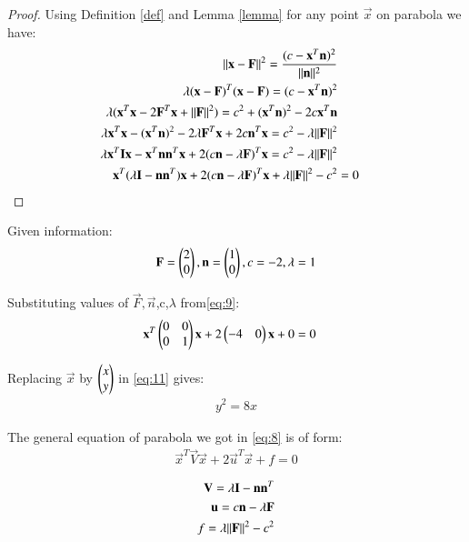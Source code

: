 \documentclass[journal,12pt,twocolumn]{IEEEtran}
\begin{document}
\begin{proof}

Using Definition \ref{def} and Lemma \ref{lemma} for any point $\vec{x}$ on parabola we have:
\begin{align}
\Vert\mathbf{x}-\mathbf{F}\rVert^2=\frac{({c-\mathbf{x}^T\mathbf{n}})^2}{\Vert\mathbf{n}\rVert^2}\label{eq:1} \\
\lambda(\mathbf{x}-\mathbf{F})^T(\mathbf{x}-\mathbf{F})=(c-\mathbf{x}^T\mathbf{n})^2
\\
\lambda(\mathbf{x}^T\mathbf{x}-2\mathbf{F}^T\mathbf{x}+\Vert\mathbf{F}\rVert^2)=c^2+(\mathbf{x}^T\mathbf{n})^2-2c\mathbf{x}^T\mathbf{n}\\
\lambda\mathbf{x}^T\mathbf{x}-(\mathbf{x}^T\mathbf{n})^2-2\lambda\mathbf{F}^T\mathbf{x}+2c\mathbf{n}^T\mathbf{x}=c^2-\lambda\Vert\mathbf{F}\rVert^2\\
\lambda\mathbf{x}^T\mathbf{I}\mathbf{x}-\mathbf{x}^T\mathbf{n}\mathbf{n}^T\mathbf{x}+2(c\mathbf{n}-\lambda\mathbf{F})^T\mathbf{x}=c^2-\lambda\Vert\mathbf{F}\rVert^2\\
\mathbf{x}^T(\lambda\mathbf{I}-\mathbf{n}\mathbf{n}^T)\mathbf{x}+2(c\mathbf{n}-\lambda\mathbf{F})^T\mathbf{x}+\lambda\Vert\mathbf{F}\rVert^2-c^2&=0\label{eq:8}
\end{align}
\end{proof}
Given information:
\begin{align}
\mathbf{F}=\begin{pmatrix}2\\0\end{pmatrix},
\mathbf{n}=\begin{pmatrix}1\\0\end{pmatrix},
c=-2\label{eq:9},
\lambda=1
\end{align}


Substituting values of $\vec{F},\vec{n}$,c,$\lambda$ from\eqref{eq:9}:
\begin{align}
\mathbf{x}^T\begin{pmatrix}0&0\\0&1\end{pmatrix}\mathbf{x}+2\begin{pmatrix}-4&0\end{pmatrix}\mathbf{x}+0&=0\label{eq:11}
\end{align}

Replacing $\vec{x}$ by $\begin{pmatrix}x\\y\end{pmatrix}$ in \eqref{eq:11} gives:
\begin{align}
y^2=8x
\end{align}

The general equation of parabola we got in \eqref{eq:8} is of form:
\begin{align}
\vec{x}^T\vec{V}\vec{x}+2\vec{u}^T\vec{x}+f=0
\end{align}

\begin{align}
\mathbf{V}=\lambda\mathbf{I}-\mathbf{n}\mathbf{n}^T\\
\mathbf{u}=c\mathbf{n}-\lambda\mathbf{F}\\
f=\lambda\Vert\mathbf{F}\rVert^2-c^2
\end{align}
\end{document}
